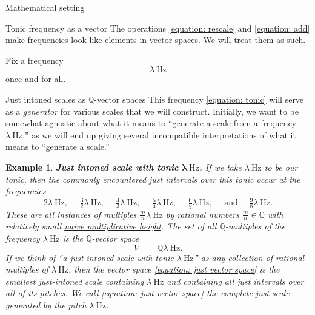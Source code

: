 \documentclass[letterpaper,11pt, reqno]{amsart}
\newtheorem{monodromy theorem}{Monodromy Theorem}[subsection]
\newtheorem{research objectives}{Research objectives}[subsection]
\newtheorem{research question}[theorem]{Research questions}
\newtheorem{aside question}[theorem]{Aside question}
\newtheorem{example}[theorem]{Example}
\newtheorem{blank remark}[theorem]{}
\newtheorem{terminology and comment}[theorem]{Terminology and comment}
\newtheorem{purity hypothesis}[theorem]{Purity hypothesis}
\newtheorem{corollary of the purity hypothesis}[theorem]{Corollary of the purity hypothesis}
\newcommand{\QQ} {{\mathbb Q}}
\numberwithin{equation}{theorem}
\begin{document}
\begin{section}{Mathematical setting}
\begin{subsection}{Tonic frequency as a vector}
The operations \eqref{equation: rescale} and \eqref{equation: add} make frequencies look like elements in vector spaces. We will treat them as such.

Fix a frequency
\begin{equation}\label{equation: tonic}
\lambda\ \text{Hz}
\end{equation}
once and for all. 

\begin{subsection}{Just intoned scales as $\QQ$-vector spaces}
This frequency \eqref{equation: tonic} will serve as a {\em generator} for various scales that we will construct. Initially, we want to be somewhat agnostic about what it means to ``generate a scale from a frequency $\lambda\ \text{Hz}$,'' as we will end up giving several incompatible interpretations of what it means to ``generate a scale.''
\end{subsection}

\begin{example}
{\bf Just intoned scale with tonic $\pmb{\lambda}\ \text{Hz}$.}
\normalfont
If we take $\lambda\ \text{Hz}$ to be our tonic, then the commonly encountered {\em just intervals over this tonic} occur at the frequencies
	$$
	2\lambda\ \text{Hz},\ \ \ \ \ \ 
	\tfrac{3}{2}\lambda\ \text{Hz},\ \ \ \ \ \ 
	\tfrac{4}{3}\lambda\ \text{Hz},\ \ \ \ \ \ 
	\tfrac{5}{4}\lambda\ \text{Hz},\ \ \ \ \ \ 
	\tfrac{6}{5}\lambda\ \text{Hz},\ \ \ \ \ \ \text{and}\ \ \ \ \ \ 
	\tfrac{9}{8}\lambda\ \text{Hz}.
	$$
These are all instances of multiples $\tfrac{m}{n}\lambda\ \text{Hz}$ by rational numbers $\tfrac{m}{n}\in\QQ$ with relatively small \href{https://en.wikipedia.org/wiki/Height_function#Naive_height}{{\em naive multiplicative height}}. The set of all $\QQ$-multiples of the frequency $\lambda\ \text{Hz}$ is the $\QQ$-vector space
	\begin{equation}\label{equation: just vector space}
	V\ \ =\ \ \QQ\lambda\ \text{Hz}.
	\end{equation}
If we think of ``a just-intoned scale with tonic $\lambda\ \text{Hz}$'' as any collection of rational multiples of $\lambda\ \text{Hz}$, then the vector space \eqref{equation: just vector space} is the smallest just-intoned scale containing $\lambda\ \text{Hz}$ and containing all just intervals over all of its pitches. We call \eqref{equation: just vector space} the {\em complete just scale generated by the pitch $\lambda\ \text{Hz}$.}
\end{example}
\end{subsection}



\end{section}
\end{document}
